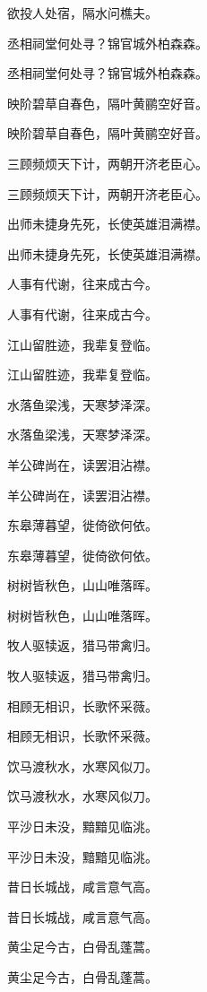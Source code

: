 \documentclass[12pt, a4paper, addpoints]{exam}
\begin{document}
\begin{questions}
\question[3] 欲投人处宿，隔水问樵夫。

\question[3] 丞相祠堂何处寻？锦官城外柏森森。

\question[3] 丞相祠堂何处寻？锦官城外柏森森。

\question[3] 映阶碧草自春色，隔叶黄鹂空好音。

\question[3] 映阶碧草自春色，隔叶黄鹂空好音。

\question[3] 三顾频烦天下计，两朝开济老臣心。

\question[3] 三顾频烦天下计，两朝开济老臣心。

\question[3] 出师未捷身先死，长使英雄泪满襟。

\question[3] 出师未捷身先死，长使英雄泪满襟。

\question[3] 人事有代谢，往来成古今。

\question[3] 人事有代谢，往来成古今。

\question[3] 江山留胜迹，我辈复登临。

\question[3] 江山留胜迹，我辈复登临。

\question[3] 水落鱼梁浅，天寒梦泽深。

\question[3] 水落鱼梁浅，天寒梦泽深。

\question[3] 羊公碑尚在，读罢泪沾襟。

\question[3] 羊公碑尚在，读罢泪沾襟。

\question[3] 东皋薄暮望，徙倚欲何依。

\question[3] 东皋薄暮望，徙倚欲何依。

\question[3] 树树皆秋色，山山唯落晖。

\question[3] 树树皆秋色，山山唯落晖。

\question[3] 牧人驱犊返，猎马带禽归。

\question[3] 牧人驱犊返，猎马带禽归。

\question[3] 相顾无相识，长歌怀采薇。

\question[3] 相顾无相识，长歌怀采薇。

\question[3] 饮马渡秋水，水寒风似刀。

\question[3] 饮马渡秋水，水寒风似刀。

\question[3] 平沙日未没，黯黯见临洮。

\question[3] 平沙日未没，黯黯见临洮。

\question[3] 昔日长城战，咸言意气高。

\question[3] 昔日长城战，咸言意气高。

\question[3] 黄尘足今古，白骨乱蓬蒿。

\question[3] 黄尘足今古，白骨乱蓬蒿。


\end{questions}
\end{document}
